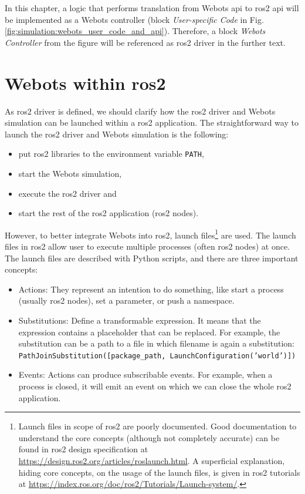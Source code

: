 In this chapter, a logic that performs translation from Webots \ac{api} to \ac{ros2} \ac{api} will be implemented as a Webots controller (block \textit{User-specific Code} in Fig. \ref{fig:simulation:webots_user_code_and_api}).
Therefore, a block \textit{Webots Controller} from the figure will be referenced as \ac{ros2} driver in the further text.

\section{Webots within \ac{ros2}}
As \ac{ros2} driver is defined, we should clarify how the \ac{ros2} driver and Webots simulation can be launched within a \ac{ros2} application. 
The straightforward way to launch the \ac{ros2} driver and Webots simulation is the following:
\begin{itemize}
    \item put \ac{ros2} libraries to the environment variable \texttt{PATH},
    \item start the Webots simulation,
    \item execute the \ac{ros2} driver and
    \item start the rest of the \ac{ros2} application (\ac{ros2} nodes).
\end{itemize}

However, to better integrate Webots into \ac{ros2}, launch files\footnote{Launch files in scope of \ac{ros2} are poorly documented. Good documentation to understand the core concepts (although not completely accurate) can be found in \ac{ros2} design specification at \url{https://design.ros2.org/articles/roslaunch.html}. A superficial explanation, hiding core concepts, on the usage of the launch files, is given in \ac{ros2} tutorials at \url{https://index.ros.org/doc/ros2/Tutorials/Launch-system/}.} are used. The launch files in \ac{ros2} allow user to execute multiple processes (often \ac{ros2} nodes) at once. The launch files are described with Python scripts, and there are three important concepts:
\begin{itemize}
    \item Actions: They represent an intention to do something, like start a process (usually \ac{ros2} nodes), set a parameter, or push a namespace. 
    \item Substitutions: Define a transformable expression. 
    It means that the expression contains a placeholder that can be replaced.
    For example, the substitution can be a path to a file in which filename is again a substitution: \\ \texttt{PathJoinSubstitution([package\_path, LaunchConfiguration('world')])}
    \item Events: Actions can produce subscribable events.
    For example, when a process is closed, it will emit an event on which we can close the whole \ac{ros2} application.
\end{itemize}

